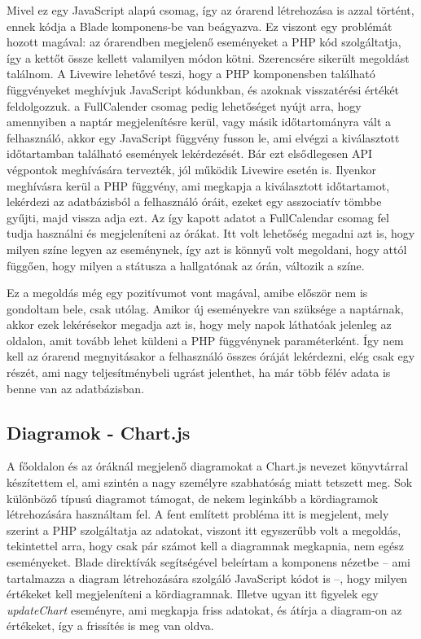 \documentclass[
]{thesis-ekf}
\theoremstyle{definition}
\theoremstyle{remark}
\begin{document}
Mivel ez egy JavaScript alapú csomag, így az órarend létrehozása is azzal történt, ennek kódja a Blade komponens-be van beágyazva. Ez viszont egy problémát hozott magával: az órarendben megjelenő eseményeket a PHP kód szolgáltatja, így a kettőt össze kellett valamilyen módon kötni. Szerencsére sikerült megoldást találnom. A Livewire lehetővé teszi, hogy a PHP komponensben található függvényeket meghívjuk JavaScript kódunkban, és azoknak visszatérési értékét feldolgozzuk. a FullCalender csomag pedig lehetőséget nyújt arra, hogy amennyiben a naptár megjelenítésre kerül, vagy másik időtartományra vált a felhasználó, akkor egy JavaScript függvény fusson le, ami elvégzi a kiválasztott időtartamban található események lekérdezését. Bár ezt elsődlegesen API végpontok meghívására tervezték, jól működik Livewire esetén is. Ilyenkor meghívásra kerül a PHP függvény, ami megkapja a kiválasztott időtartamot, lekérdezi az adatbázisból a felhasználó óráit, ezeket egy asszociatív tömbbe gyűjti, majd vissza adja ezt. Az így kapott adatot a FullCalendar csomag fel tudja használni és megjeleníteni az órákat. Itt volt lehetőség megadni azt is, hogy milyen színe legyen az eseménynek, így azt is könnyű volt megoldani, hogy attól függően, hogy milyen a státusza a hallgatónak az órán, változik a színe.

Ez a megoldás még egy pozitívumot vont magával, amibe először nem is gondoltam bele, csak utólag. Amikor új eseményekre van szüksége a naptárnak, akkor ezek lekérésekor megadja azt is, hogy mely napok láthatóak jelenleg az oldalon, amit tovább lehet küldeni a PHP függvénynek paraméterként. Így nem kell az órarend megnyitásakor a felhasználó összes óráját lekérdezni, elég csak egy részét, ami nagy teljesítménybeli ugrást jelenthet, ha már több félév adata is benne van az adatbázisban.



\subsection{Diagramok - Chart.js}

A főoldalon és az óráknál megjelenő diagramokat a Chart.js\cite{chartjs} nevezet könyvtárral készítettem el, ami szintén a nagy személyre szabhatóság  miatt tetszett meg. Sok különböző típusú diagramot támogat, de nekem leginkább a kördiagramok létrehozására használtam fel. A fent említett probléma itt is megjelent, mely szerint a PHP szolgáltatja az adatokat, viszont itt egyszerűbb volt a megoldás, tekintettel arra, hogy csak pár számot kell a diagramnak megkapnia, nem egész eseményeket. Blade direktívák segítségével beleírtam a komponens nézetbe -- ami tartalmazza a diagram létrehozására szolgáló JavaScript kódot is --, hogy milyen értékeket kell megjeleníteni a kördiagramnak. Illetve ugyan itt figyelek egy \emph{updateChart} eseményre, ami megkapja friss adatokat, és átírja  a diagram-on az értékeket, így a frissítés is meg van oldva.
\end{document}
